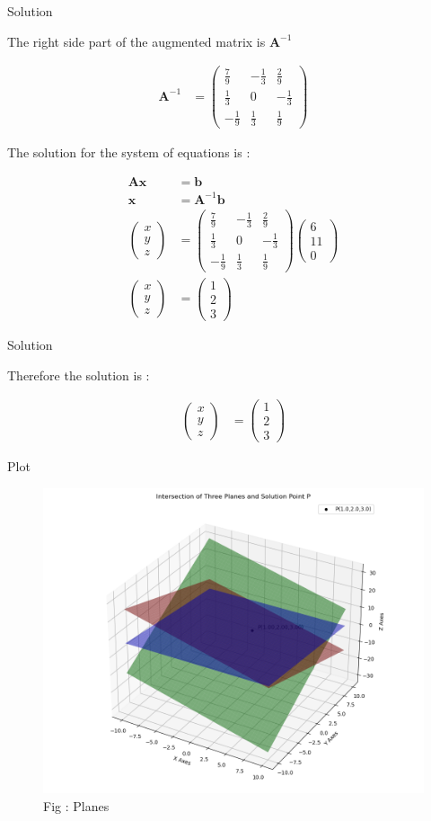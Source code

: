 \documentclass{beamer}
\numberwithin{equation}{section}
\theoremstyle{remark}
\newcommand{\myvec}[1]{\ensuremath{\begin{pmatrix}#1\end{pmatrix}}}
\let\vec\mathbf
\begin{document}
\begin{frame}{Solution}

The right side part of the augmented matrix is $\vec{A}^{-1}$

\begin{align}
  \vec{A}^{-1} &= \myvec{\tfrac{7}{9} & -\tfrac{1}{3} & \tfrac{2}{9}\\\tfrac{1}{3} & 0 & -\tfrac{1}{3}\\-\tfrac{1}{9} & \tfrac{1}{3} & \tfrac{1}{9}}
\end{align}

The solution for the system of equations is :

\begin{align}
  \vec{A}\vec{x} &= \vec{b}\\
  \vec{x} &= \vec{A}^{-1}\vec{b}\\
  \myvec{x\\y\\z} &= \myvec{\tfrac{7}{9} & -\tfrac{1}{3} & \tfrac{2}{9}\\\tfrac{1}{3} & 0 & -\tfrac{1}{3}\\-\tfrac{1}{9} & \tfrac{1}{3} & \tfrac{1}{9}}\myvec{6\\11\\0}\\
  \myvec{x\\y\\z} &= \myvec{1\\2\\3}
\end{align}

\end{frame}

\begin{frame}{Solution}

Therefore the solution is :

\begin{align}
\myvec{x\\y\\z} &= \myvec{1\\2\\3}
\end{align}

\end{frame}

\begin{frame}{Plot}

\begin{figure}[h!]
  \centering
  \includegraphics[width=0.7\columnwidth]{figs/solution.png} 
   \caption*{Fig : Planes}
  \label{Fig1}
\end{figure}

\end{frame}
\end{document}
